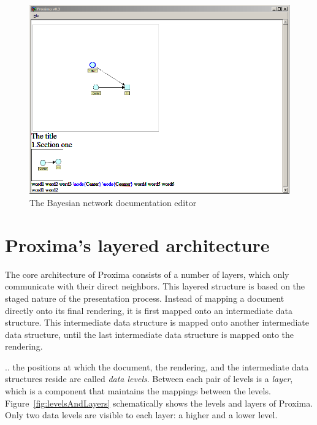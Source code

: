 \documentclass[12pt]{article}
\begin{document}
\el

\bc
\begin{figure}[ht]
\centering
\includegraphics[width=\textwidth]{images/screenshots/BayesDocEditor}
\caption{The Bayesian network documentation editor}
\label{fig:bayesEditor}
\end{figure}
\ec

%
\section{Proxima's layered architecture} \label{sec:architecture}
%

The core architecture of Proxima consists of a number of layers, which only communicate with their direct neighbors. This layered structure is based on the staged nature of the presentation process. Instead of mapping a document directly onto its final rendering, it is first mapped onto an intermediate data structure. This intermediate data structure is mapped onto another intermediate data structure, until the last intermediate data structure is mapped onto the rendering.

..  the positions at which the document, the rendering, and the intermediate data structures reside are called {\em data levels}. Between each pair of levels is a {\em layer}, which is a component that maintains the mappings between the levels. Figure~\ref{fig:levelsAndLayers} schematically shows the levels and layers of Proxima. Only two data levels are visible to each layer: a higher and a lower level.
\end{document}
